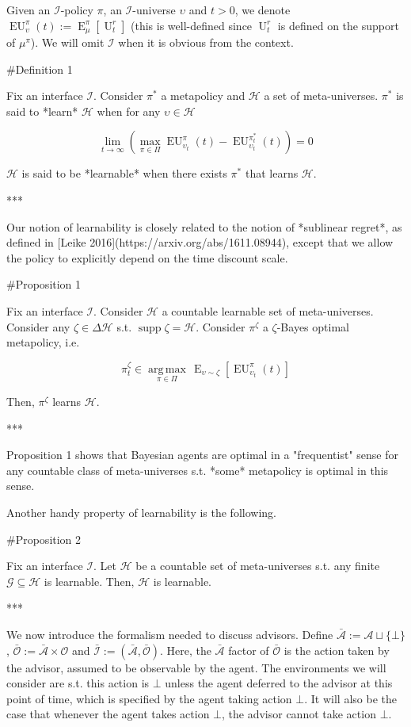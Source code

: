 \documentclass[a4paper]{article}
\DeclareMathOperator{\Supp}{supp}
\DeclareMathOperator{\E}{E}
\newcommand{\Argmax}[1]{\underset{#1}{\operatorname{arg\,max}}\,}
\newcommand{\Ob}{\mathcal{O}}
\newcommand{\A}{\mathcal{A}}
\newcommand{\I}{\mathcal{I}}
\newcommand{\Ado}{\bar{\Ob}}
\newcommand{\Ada}{\bar{\A}}
\newcommand{\Adi}{\bar{\I}}
\newcommand{\Hy}{\mathcal{H}}
\newcommand{\Ut}{\operatorname{U}}
\newcommand{\EU}{\operatorname{EU}}
\begin{document}
Given an $\I$-policy $\pi$, an $\I$-universe $\upsilon$ and $t > 0$, we denote $\EU_\upsilon^\pi(t):=\E_\mu^\pi[\Ut^r_t]$ (this is well-defined since $\Ut^r_t$ is defined on the support of $\mu^\pi$). We will omit $\I$ when it is obvious from the context.

\#Definition 1

Fix an interface $\I$. Consider $\pi^*$ a metapolicy and $\Hy$ a set of meta-universes. $\pi^*$ is said to *learn* $\Hy$ when for any $\upsilon \in \Hy$

$$\lim_{t \rightarrow \infty} (\max_{\pi \in \Pi} \EU_{\upsilon_t}^{\pi}(t) - \EU_{\upsilon_t}^{\pi^*_t}(t)) = 0$$

$\Hy$ is said to be *learnable* when there exists $\pi^*$ that learns $\Hy$.

***

Our notion of learnability is closely related to the notion of *sublinear regret*, as defined in [Leike 2016](https://arxiv.org/abs/1611.08944), except that we allow the policy to explicitly depend on the time discount scale.

\#Proposition 1

Fix an interface $\I$. Consider $\Hy$ a countable learnable set of meta-universes. Consider any $\zeta \in \Delta\Hy$ s.t. $\Supp \zeta = \Hy$. Consider $\pi^\zeta$ a $\zeta$-Bayes optimal metapolicy, i.e.

$$\pi^\zeta_t \in \Argmax{\pi \in \Pi} \E_{\upsilon \sim \zeta}[\EU_{\upsilon_t}^{\pi}(t)]$$

Then, $\pi^\zeta$ learns $\Hy$.

***

Proposition 1 shows that Bayesian agents are optimal in a "frequentist" sense for any countable class of meta-universes s.t. *some* metapolicy is optimal in this sense.

Another handy property of learnability is the following.

\#Proposition 2

Fix an interface $\I$. Let $\Hy$ be a countable set of meta-universes s.t. any finite $\mathcal{G} \subseteq \Hy$ is learnable. Then, $\Hy$ is learnable.

***

We now introduce the formalism needed to discuss advisors. Define $\Ada:=\A \sqcup \{\bot\}$, $\Ado:=\Ada \times \Ob$ and $\Adi:=(\Ada,\Ado)$. Here, the $\Ada$ factor of $\Ado$ is the action taken by the advisor, assumed to be observable by the agent. The environments we will consider are s.t. this action is $\bot$ unless the agent deferred to the advisor at this point of time, which is specified by the agent taking action $\bot$. It will also be the case that whenever the agent takes action $\bot$, the advisor cannot take action $\bot$.
\end{document}
